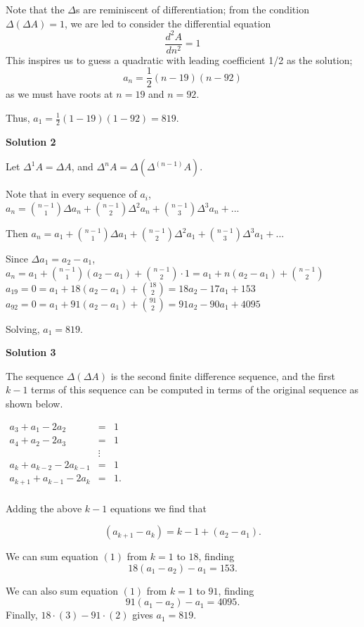 \begin{enumerate}
Note that the $\Delta$s are reminiscent of differentiation; from the condition $\Delta(\Delta{A}) = 1$, we are led to consider the differential equation
 \[\frac{d^2 A}{dn^2} = 1\]This inspires us to guess a quadratic with leading coefficient 1/2 as the solution; 
 \[a_{n} = \frac{1}{2}(n-19)(n-92)\]as we must have roots at $n = 19$ and $n = 92$.

 Thus, $a_1=\frac{1}{2}(1-19)(1-92)=\boxed{819}$.

 



\textbf{Solution 2}

Let $\Delta^1 A=\Delta A$, and $\Delta^n A=\Delta(\Delta^{(n-1)}A)$.

 Note that in every sequence of $a_i$, $a_n=\binom{n-1}{1}\Delta a_n + \binom{n-1}{2}\Delta^2 a_n +\binom{n-1}{3}\Delta^3 a_n + ...$

 Then $a_n=a_1 +\binom{n-1}{1}\Delta a_1 +\binom{n-1}{2}\Delta^2 a_1 +\binom{n-1}{3}\Delta^3 a_1 + ...$

 Since $\Delta a_1 =a_2 -a_1$, $a_n=a_1 +\binom{n-1}{1}(a_2-a_1) +\binom{n-1}{2}\cdot 1=a_1 +n(a_2-a_1) +\binom{n-1}{2}$
$a_{19}=0=a_1+18(a_2-a_1)+\binom{18}{2}=18a_2-17a_1+153$
$a_{92}=0=a_1+91(a_2-a_1)+\binom{91}{2}=91a_2-90a_1+4095$

 Solving, $a_1=\boxed{819}$.

 



\textbf{Solution 3}

The sequence $\Delta(\Delta A)$ is the second finite difference sequence, and the first $k-1$ terms of this sequence can be computed in terms of the original sequence as shown below.

 $\begin{array}{rcl} a_3+a_1-2a_2&=&1\\ a_4+a_2-2a_3&=&1\\ &\vdots\\ a_k + a_{k-2} - 2a_{k-1} &= &1\\ a_{k+1} + a_{k-1} - 2a_k &=& 1.\\ \end{array}$

 Adding the above $k-1$ equations we find that

 
 \[(a_{k+1} - a_k) = k-1 + (a_2-a_1).\tag{1}\]

 We can sum equation $(1)$ from $k=1$ to $18$, finding
 \[18(a_1-a_2) - a_1 = 153.\tag{2}\]

 We can also sum equation $(1)$ from $k=1$ to $91$, finding
 \[91(a_1-a_2) - a_1 = 4095.\tag{3}\]Finally, $18\cdot (3) - 91\cdot(2)$ gives $a_1=\boxed{819}$.


\end{enumerate}
